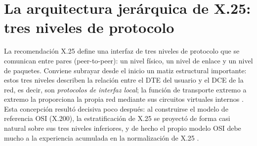\documentclass[12pt,a4paper]{article}
\begin{document}
\section{La arquitectura jerárquica de X.25: tres niveles de protocolo}

La recomendación X.25 define una interfaz de tres niveles de protocolo que se comunican entre pares (peer-to-peer): un nivel físico, un nivel de enlace y un nivel de paquetes. Conviene subrayar desde el inicio un matiz estructural importante: estos tres niveles describen la relación entre el DTE del usuario y el DCE de la red, es decir, son \emph{protocolos de interfaz local}; la función de transporte extremo a extremo la proporciona la propia red mediante sus circuitos virtuales internos \cite{stallings2004, rybczynski1980}. Esta concepción resultó decisiva poco después: al construirse el modelo de referencia OSI (X.200), la estratificación de X.25 se proyectó de forma casi natural sobre sus tres niveles inferiores, y de hecho el propio modelo OSI debe mucho a la experiencia acumulada en la normalización de X.25 \cite{tanenbaum2012}.
\end{document}
